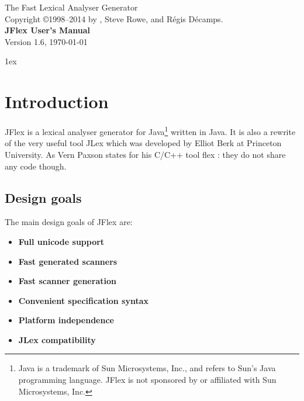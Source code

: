 \documentclass[11pt]{scrartcl}
\newcommand{\ver}{1.6}
\begin{document}


\begin{center}
\sffamily
{\Large The Fast Lexical Analyser Generator}\\
\smallskip\smallskip
Copyright \copyright 1998--2014 by ,
Steve Rowe, and R\'egis D\'ecamps.
\\
\bigskip
{\Huge \sffamily \bfseries JFlex User's Manual}\\
\bigskip
Version \ver, {\today}
\end{center}

\tableofcontents
\vfill
\newpage
\parindent0pt\parskip1ex


\section{Introduction}\label{Intro}

JFlex is a lexical analyser generator for Java\footnote{Java is a trademark of 
Sun Microsystems, Inc., and refers to Sun's Java programming language. 
JFlex is not sponsored by or affiliated with Sun Microsystems, Inc.}
written in Java. It is also a rewrite of the very useful tool JLex \cite{JLex} which
was developed by Elliot Berk at Princeton University. As Vern Paxson states
for his C/C++ tool flex \cite{flex}: they do not share any code though.

\subsection{Design goals}
The main design goals of JFlex are:
\begin{itemize}
\item \textbf{Full unicode support}
\item \textbf{Fast generated scanners}
\item \textbf{Fast scanner generation}
\item \textbf{Convenient specification syntax}
\item \textbf{Platform independence}
\item \textbf{JLex compatibility}
\end{itemize}
\end{document}
